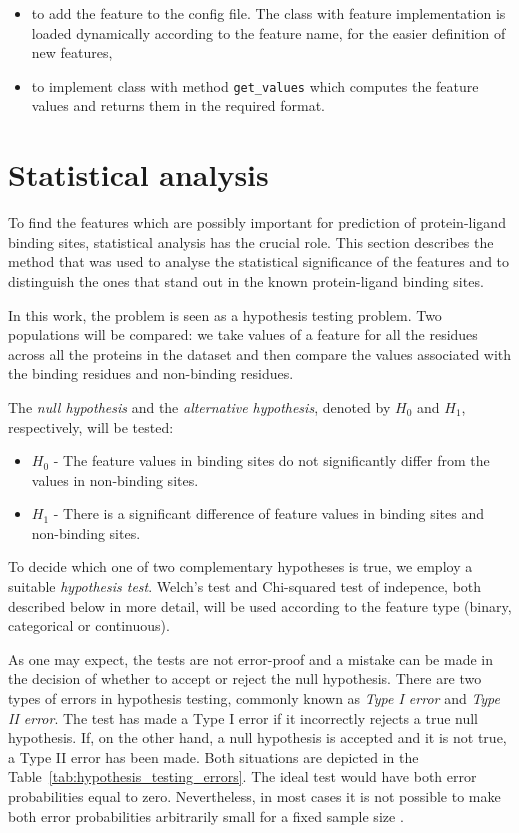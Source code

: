 \begin{itemize}
\item to add the feature to the config file. The class with feature implementation is loaded dynamically according to the feature name, for the easier definition of new features,
\item to implement class with method \texttt{get\_values} which computes the feature values and returns them in the required format.
\end{itemize}

\section{Statistical analysis}

To find the features which are possibly important for prediction of protein-ligand binding sites, statistical analysis has the crucial role. This section describes the method that was used to analyse the statistical significance of the features and to distinguish the ones that stand out in the known protein-ligand binding sites.

In this work, the problem is seen as a hypothesis testing problem. Two populations will be compared: we take values of a feature for all the residues across all the proteins in the dataset and then compare the values associated with the binding residues and non-binding residues.

The \textit{null hypothesis} and the \textit{alternative hypothesis}, denoted by $H_{0}$ and $H_{1}$, respectively, will be tested:

\begin{itemize}
\item \textbf{$H_{0}$} - The feature values in binding sites do not significantly differ from the values in non-binding sites.
\item \textbf{$H_{1}$} - There is a significant difference of feature values in binding sites and non-binding sites.
\end{itemize}

To decide which one of two complementary hypotheses is true, we employ a suitable \textit{hypothesis test}. Welch's test and Chi-squared test of indepence, both described below in more detail, will be used according to the feature type (binary, categorical or continuous). 

As one may expect, the tests are not error-proof and a mistake can be made in the decision of whether to accept or reject the null hypothesis. There are two types of errors in hypothesis testing, commonly known as \textit{Type I error} and \textit{Type II error}. The test has made a Type I error if it incorrectly rejects a true null hypothesis. If, on the other hand, a null hypothesis is accepted and it is not true, a Type II error has been made. Both situations are depicted in the Table~\ref{tab:hypothesis_testing_errors}. The ideal test would have both error probabilities equal to zero. Nevertheless, in most cases it is not possible to make both error probabilities arbitrarily small for a fixed sample size \cite{casella}.

